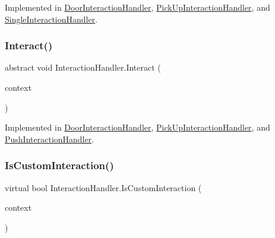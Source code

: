 Implemented in \mbox{\hyperlink{class_door_interaction_handler_a946244bed82fef5c376529a64fcc9f06}{Door\+Interaction\+Handler}}, \mbox{\hyperlink{class_pick_up_interaction_handler_ab989c9d6c0e2f7849c7c6cbf7b0827fd}{Pick\+Up\+Interaction\+Handler}}, and \mbox{\hyperlink{class_single_interaction_handler_a79e3c1727bf6f3f9068c6d15bf394b41}{Single\+Interaction\+Handler}}.

\mbox{\label{class_interaction_handler_ae240fb919621a4e6d5e3dc6130c809d0}} 
\subsubsection{\texorpdfstring{Interact()}{Interact()}}
{\footnotesize\ttfamily abstract void Interaction\+Handler.\+Interact (\begin{DoxyParamCaption}\item[{\mbox{\hyperlink{class_interaction_context}{Interaction\+Context}}}]{context }\end{DoxyParamCaption})\hspace{0.3cm}{\ttfamily [pure virtual]}}



Implemented in \mbox{\hyperlink{class_door_interaction_handler_ab4099b8368bb7d8cb8e0d8ed0795e9b9}{Door\+Interaction\+Handler}}, \mbox{\hyperlink{class_pick_up_interaction_handler_a4f55440deca34467164222fbbed1c409}{Pick\+Up\+Interaction\+Handler}}, and \mbox{\hyperlink{class_push_interaction_handler_af820f5de9628e2f527d5d0f35afc01d7}{Push\+Interaction\+Handler}}.

\mbox{\label{class_interaction_handler_aa6e40ea3f53f5f2a900fd25cf84c8b7f}} 
\subsubsection{\texorpdfstring{Is\+Custom\+Interaction()}{IsCustomInteraction()}}
{\footnotesize\ttfamily virtual bool Interaction\+Handler.\+Is\+Custom\+Interaction (\begin{DoxyParamCaption}\item[{\mbox{\hyperlink{class_interaction_context}{Interaction\+Context}}}]{context }\end{DoxyParamCaption})\hspace{0.3cm}{\ttfamily [virtual]}}



